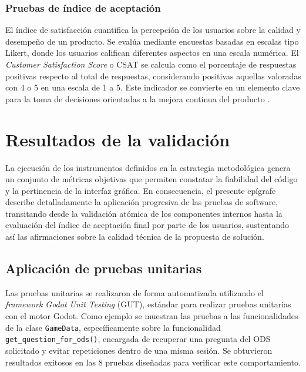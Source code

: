\subsubsection{Pruebas de índice de aceptación}
\label{subsubsec:pruebas_indice_aceptacion}

El índice de satisfacción cuantifica la percepción de los usuarios sobre la calidad y desempeño de un producto. Se evalúa mediante encuestas basadas en escalas tipo Likert, donde los usuarios califican diferentes aspectos en una escala numérica. El \textit{Customer Satisfaction Score} o CSAT se calcula como el porcentaje de respuestas positivas respecto al total de respuestas, considerando positivas aquellas valoradas con 4 o 5 en una escala de 1 a 5. Este indicador se convierte en un elemento clave para la toma de decisiones orientadas a la mejora continua del producto \parencite{Pressman2019}.

\section{Resultados de la validación}
\label{sec:validacion}

La ejecución de los instrumentos definidos en la estrategia metodológica genera un conjunto de métricas objetivas que permiten constatar la fiabilidad del código y la pertinencia de la interfaz gráfica. En consecuencia, el presente epígrafe describe detalladamente la aplicación progresiva de las pruebas de software, transitando desde la validación atómica de los componentes internos hasta la evaluación del índice de aceptación final por parte de los usuarios, sustentando así las afirmaciones sobre la calidad técnica de la propuesta de solución.

\subsection{Aplicación de pruebas unitarias}
\label{subsec:aplicacion_pruebas_unitarias}

Las pruebas unitarias se realizaron de forma automatizada utilizando el \textit{framework Godot Unit Testing} (GUT), estándar para realizar pruebas unitarias con el motor Godot. Como ejemplo se muestran las pruebas a las funcionalidades de la clase \texttt{GameData}, específicamente sobre la funcionalidad \texttt{get\_question\_for\_ods()}, encargada de recuperar una pregunta del ODS solicitado y evitar repeticiones dentro de una misma sesión. Se obtuvieron resultados exitosos en las 8 pruebas diseñadas para verificar este comportamiento.

